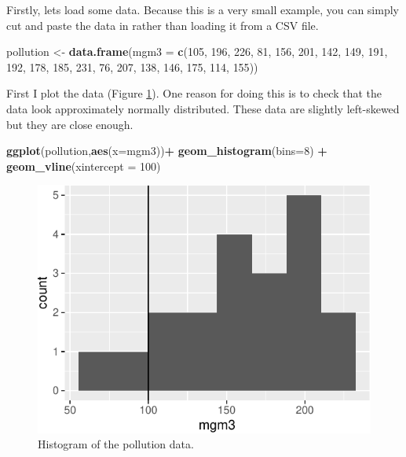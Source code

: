 \documentclass[
  a4paperpaper,
]{book}
\newenvironment{Shaded}{\begin{snugshade}}{\end{snugshade}}
\newcommand{\DataTypeTok}[1]{\textcolor[rgb]{0.13,0.29,0.53}{#1}}
\newcommand{\DecValTok}[1]{\textcolor[rgb]{0.00,0.00,0.81}{#1}}
\newcommand{\KeywordTok}[1]{\textcolor[rgb]{0.13,0.29,0.53}{\textbf{#1}}}
\newcommand{\NormalTok}[1]{#1}
\newcommand{\OperatorTok}[1]{\textcolor[rgb]{0.81,0.36,0.00}{\textbf{#1}}}
\newcommand{\StringTok}[1]{\textcolor[rgb]{0.31,0.60,0.02}{#1}}
\begin{document}
Firstly, lets load some data. Because this is a very small example, you can simply cut and paste the data in rather than loading it from a CSV file.

\begin{Shaded}
\begin{Highlighting}[]
\NormalTok{pollution \textless{}{-}}\StringTok{ }\KeywordTok{data.frame}\NormalTok{(}\DataTypeTok{mgm3 =} \KeywordTok{c}\NormalTok{(}\DecValTok{105}\NormalTok{, }\DecValTok{196}\NormalTok{, }\DecValTok{226}\NormalTok{, }\DecValTok{81}\NormalTok{, }\DecValTok{156}\NormalTok{, }\DecValTok{201}\NormalTok{, }\DecValTok{142}\NormalTok{, }\DecValTok{149}\NormalTok{, }\DecValTok{191}\NormalTok{, }\DecValTok{192}\NormalTok{,}
                                \DecValTok{178}\NormalTok{, }\DecValTok{185}\NormalTok{, }\DecValTok{231}\NormalTok{, }\DecValTok{76}\NormalTok{, }\DecValTok{207}\NormalTok{, }\DecValTok{138}\NormalTok{, }\DecValTok{146}\NormalTok{, }\DecValTok{175}\NormalTok{, }\DecValTok{114}\NormalTok{, }\DecValTok{155}\NormalTok{))}
\end{Highlighting}
\end{Shaded}

First I plot the data (Figure \ref{fig:pollution}). One reason for doing this is to check that the data look approximately normally distributed. These data are slightly left-skewed but they are close enough.

\begin{Shaded}
\begin{Highlighting}[]
\KeywordTok{ggplot}\NormalTok{(pollution,}\KeywordTok{aes}\NormalTok{(}\DataTypeTok{x=}\NormalTok{mgm3))}\OperatorTok{+}
\StringTok{  }\KeywordTok{geom\_histogram}\NormalTok{(}\DataTypeTok{bins=}\DecValTok{8}\NormalTok{) }\OperatorTok{+}
\StringTok{  }\KeywordTok{geom\_vline}\NormalTok{(}\DataTypeTok{xintercept =} \DecValTok{100}\NormalTok{)}
\end{Highlighting}
\end{Shaded}

\begin{figure}

{\centering \includegraphics{BB852_files/figure-latex/pollution-1} 

}

\caption{Histogram of the pollution data.}\label{fig:pollution}
\end{figure}
\end{document}
